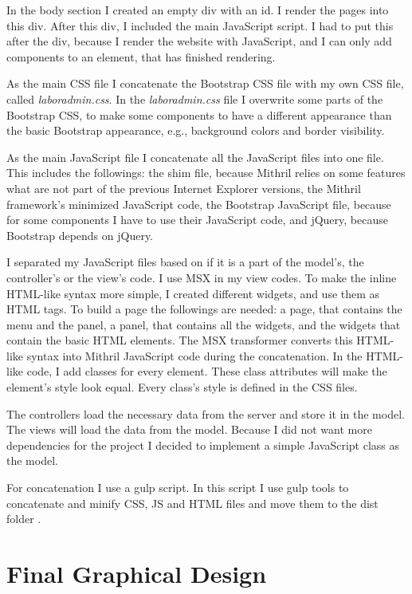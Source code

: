 In the body section I created an empty div with an id. I render the pages into this div. After this div, I included the main JavaScript script. I had to put this after the div, because I render the website with JavaScript, and I can only add components to an element, that has finished rendering.

As the main CSS file I concatenate the Bootstrap CSS file with my own CSS file, called \mbox{\emph{laboradmin.css}}. In the \mbox{\emph{laboradmin.css}} file I overwrite some parts of the Bootstrap CSS, to make some components to have a different appearance than the basic Bootstrap appearance, e.g., background colors and border visibility.

As the main JavaScript file I concatenate all the JavaScript files into one file. This includes the followings: the shim file, because Mithril relies on some features what are not part of the previous Internet Explorer versions, the Mithril framework's minimized JavaScript code, the Bootstrap JavaScript file, because for some components I have to use their JavaScript code, and jQuery, because Bootstrap depends on jQuery. 

I separated my JavaScript files based on if it is a part of the model's, the controller's or the view's code. I use MSX in my view codes. To make the inline HTML-like syntax more simple, I created different widgets, and use them as HTML tags. To build a page the followings are needed: a page, that contains the menu and the panel, a panel, that contains all the widgets, and the widgets that contain the basic HTML elements. The MSX transformer converts this HTML-like syntax into Mithril JavaScript code during the concatenation. In the HTML-like code, I add classes for every element. These class attributes will make the element's style look equal. Every class's style is defined in the CSS files.

The controllers load the necessary data from the server and store it in the model. The views will load the data from the model. Because I did not want more dependencies for the project I decided to implement a simple JavaScript class as the model.

For concatenation I use a gulp script. In this script I use gulp tools to concatenate and minify CSS, JS and HTML files and move them to the dist folder .

\newpage
\section{Final Graphical Design}

